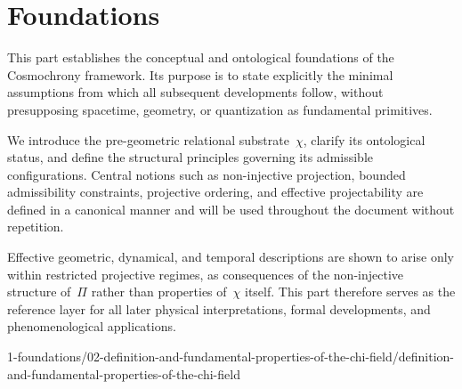 \clearpage
\part{Foundations}
  \label{part:foundations}

  This part establishes the conceptual and ontological foundations of the Cosmochrony
  framework.
  Its purpose is to state explicitly the minimal assumptions from which all subsequent
  developments follow, without presupposing spacetime, geometry, or quantization as
  fundamental primitives.

  We introduce the pre-geometric relational substrate~$\chi$, clarify its ontological
  status, and define the structural principles governing its admissible configurations.
  Central notions such as non-injective projection, bounded admissibility constraints,
  projective ordering, and effective projectability are defined in a canonical manner
  and will be used throughout the document without repetition.

  Effective geometric, dynamical, and temporal descriptions are shown to arise only
  within restricted projective regimes, as consequences of the non-injective structure
  of~$\Pi$ rather than properties of~$\chi$ itself.
  This part therefore serves as the reference layer for all later physical
  interpretations, formal developments, and phenomenological applications.

  \clearpage
  
  
  {1-foundations/02-definition-and-fundamental-properties-of-the-chi-field/definition-and-fundamental-properties-of-the-chi-field}
